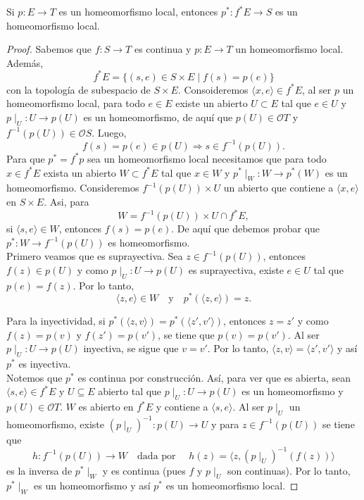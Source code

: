 \begin{lema}\label{Lem 2.5.5}
    Si $p\colon E\to T$ es un homeomorfismo local, entonces $p^*\colon f^*E\to S$ es un homeomorfismo local.
\end{lema}

\begin{proof}
Sabemos que $f\colon S\to T$ es continua y $p\colon E\to T$ un homeomorfismo local. Además, 
\[
f^*E=\{(s,e)\in S\times E\mid f(s)=p(e)\}
\]
con la topología de subespacio de $S\times E$. Consoideremos $\langle x, e\rangle\in f^*E$, al ser $p$ un homeomorfismo local, para todo 
$e\in E$ existe un abierto $U\subset E$ tal que $e\in U$ y $p\mid_U\colon U\to p(U)$ es un homeomorfismo, de aquí que $p(U)\in \mathcal{O}T$ y $f^{-1}(p(U))\in \mathcal{O}S$. Luego,
\[
f(s)=p(e)\in p(U)\Rightarrow s\in f^{-1}(p(U)).
\]
Para que $p^*=f^*p$ sea un homeomorfismo local necesitamos que para todo $x\in f^*E$ exista un abierto $W\subset f^*E$ tal que $x\in W$ y $p^*\mid_W\colon W\to p^*(W)$ es un homeomorfismo. 
Consideremos $f^{-1}(p(U))\times U$ un abierto que contiene a $\langle x, e\rangle$ en $S\times E$. Asi, para 
\[
W=f^{-1}(p(U))\times U\cap f^*E,
\]
si $\langle s, e\rangle\in W$, entonces $f(s)=p(e)$. De aquí que debemos probar que $p^*\colon W\to f^{-1}(p(U))$ es homeomorfismo.\\

Primero veamos que es suprayectiva. Sea $z\in f^{-1}(p(U))$, entonces $f(z)\in p(U)$ y como $p\mid_U\colon U\to p(U)$ es suprayectiva, existe $e\in U$ tal que $p(e)=f(z)$. Por lo tanto,
\[
\langle z, e\rangle\in W\quad\text{y}\quad p^*(\langle z, e\rangle)=z.
\]

Para la inyectividad, si $p^*(\langle z, v\rangle)=p^*(\langle z', v' \rangle)$, entonces $z=z'$ y como $f(z)=p(v)$ y $f(z')=p(v')$, se tiene que $p(v)=p(v')$. Al ser $p\mid_U\colon U\to p(U)$ inyectiva, se sigue que $v=v'$. 
Por lo tanto, $\langle z, v\rangle=\langle z', v'\rangle$ y así $p^*$ es inyectiva.\\

Notemos que $p^*$ es continua por construcción. Así, para ver que es abierta, sean $\langle s,e\rangle\in f^*E$ y $U\subseteq E$ abierto tal que $p\mid_U\colon U\to p(U)$ es un homeomorfismo y $p(U)\in \mathcal{O}T$. $W$ es 
abierto en $f^*E$ y contiene a $\langle s,e\rangle$. Al ser $p\mid_U$ un homeomorfismo, existe $(p\mid_U)^{-1}\colon p(U)\to U$ y para $z\in f^{-1}(p(U))$ se tiene que
\[
h\colon f^{-1}(p(U))\to W\quad \mbox{dada por }\quad h(z)=\langle z, (p\mid_U)^{-1}(f(z))\rangle    
\]
es la inversa de $p^*\mid_W$ y es continua (pues $f$ y $p\mid_U$ son continuas). Por lo tanto, $p^*\mid_W$ es un homeomorfismo y así $p^*$ es un homeomorfismo local.
\end{proof}

